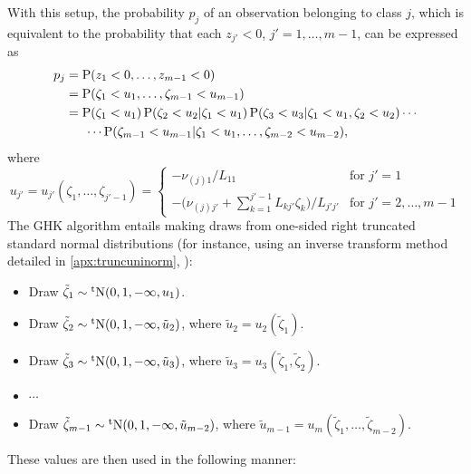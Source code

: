 With this setup, the probability $p_{j}$ of an observation belonging to class $j$, which is equivalent to the probability that each $ z_{j'} < 0$, $j'=1,\dots,m-1$, can be expressed as
\begin{align*}
  p_j 
  &= \operatorname{P}( z_1 < 0,\dots, z_{m-1} < 0) \\
  &= 
  \operatorname{P}(\zeta_1 < u_1,\dots,\zeta_{m-1}<u_{m-1}) \\
  &= 
  \operatorname{P}(\zeta_1 < u_1)
  \operatorname{P}(\zeta_2 < u_2|\zeta_1 < u_1)
  \operatorname{P}(\zeta_3 < u_3|\zeta_1 < u_1,\zeta_2 < u_2)
  \cdots \\
  &\phantom{==}\cdots
  \operatorname{P}(\zeta_{m-1}<u_{m-1}|\zeta_1 < u_1,\dots,\zeta_{m-2}<u_{m-2}),
\end{align*}
where 
\begin{equation*}
  u_{j'} = 
  u_{j'}(\zeta_1,\dots,\zeta_{j'-1}) =
  \begin{cases}
    - \nu_{(j)1} / L_{11} &\text{for } j' = 1 \\
    - \big(\nu_{(j)j'} + \sum_{k=1}^{j'-1} L_{kj'}\zeta_k \big) / L_{j'j'} &\text{for } j' = 2,\dots,m-1
  \end{cases}
\end{equation*}
The GHK algorithm entails making draws from one-sided right truncated standard normal distributions (for instance, using an inverse transform method detailed in \cref{apx:truncuninorm},  ):
\begin{itemize}
  \item Draw $\tilde\zeta_1 \sim \operatorname{{}^tN}(0,1,-\infty,u_1)$.
  \item Draw $\tilde\zeta_2 \sim \operatorname{{}^tN}(0,1,-\infty,\tilde u_2)$, where $\tilde u_2 = u_2(\tilde\zeta_1)$.
  \item Draw $\tilde\zeta_3 \sim \operatorname{{}^tN}(0,1,-\infty,\tilde u_3)$, where $\tilde u_3 = u_3(\tilde\zeta_1,\tilde\zeta_2)$. 
  \item $\cdots$
  \item Draw $\tilde\zeta_{m-1} \sim \operatorname{{}^tN}(0,1,-\infty,\tilde u_{m-2})$, where $\tilde u_{m-1} = u_m(\tilde\zeta_1,\dots,\tilde\zeta_{m-2})$.
\end{itemize}
These values are then used in the following manner:
